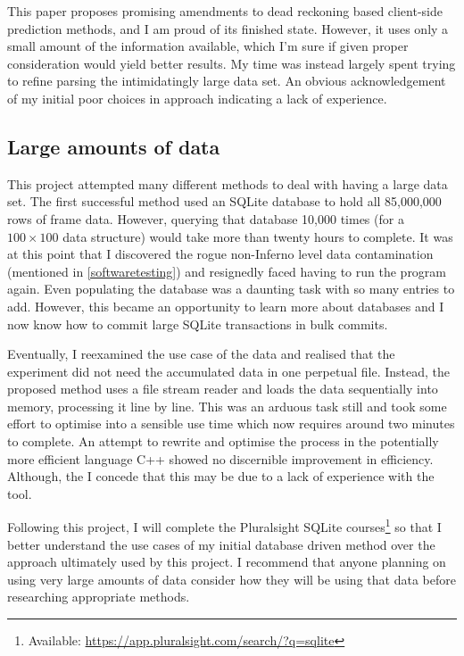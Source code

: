 \documentclass[journal]{IEEEtran}
\begin{document}
This paper proposes promising amendments to dead reckoning based client-side prediction methods, and I am proud of its finished state. However, it uses only a small amount of the information available, which I'm sure if given proper consideration would yield better results. My time was instead largely spent trying to refine parsing the intimidatingly large data set. An obvious acknowledgement of my initial poor choices in approach indicating a lack of experience.

\subsection{Large amounts of data} \label{databaseapproach}

This project attempted many different methods to deal with having a large data set. The first successful method used an SQLite database to hold all 85,000,000 rows of frame data. However, querying that database 10,000 times (for a $100 \times 100$ data structure) would take more than twenty hours to complete. It was at this point that I discovered the rogue non-Inferno level data contamination (mentioned in \ref{softwaretesting}) and resignedly faced having to run the program again. Even populating the database was a daunting task with so many entries to add. However, this became an opportunity to learn more about databases and I now know how to commit large SQLite transactions in bulk commits.

Eventually, I reexamined the use case of the data and realised that the experiment did not need the accumulated data in one perpetual file. Instead, the proposed method uses a file stream reader and loads the data sequentially into memory, processing it line by line. This was an arduous task still and took some effort to optimise into a sensible use time which now requires around two minutes to complete. An attempt to rewrite and optimise the process in the potentially more efficient language C++ showed no discernible improvement in efficiency. Although, the I concede that this may be due to a lack of experience with the tool.

Following this project, I will complete the Pluralsight SQLite courses\footnote[9]{Available: \url{https://app.pluralsight.com/search/?q=sqlite}} so that I better understand the use cases of my initial database driven method over the approach ultimately used by this project. I recommend that anyone planning on using very large amounts of data consider how they will be using that data before researching appropriate methods.
\end{document}
